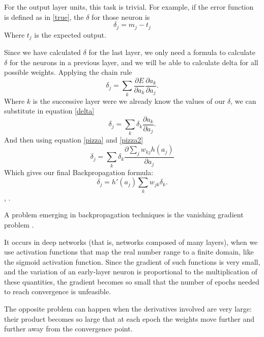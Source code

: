 \documentclass[a4paper]{report}
\begin{document}
For the output layer units, this task is trivial.
For example, if the error function is defined as in \ref{true}, the $\delta$ for those neuron is
\begin{equation}
\delta_j = m_j - t_j
\end{equation}
Where $t_j$ is the expected output.

Since we have calculated $\delta$ for the last layer, we only need a formula to calculate $\delta$ for the neurons in a previous layer, and we will be able to calculate delta for all possible weights.
Applying the chain rule
\begin{equation}
\delta_j = \sum_k \frac{\partial E}{\partial a_k} \frac{\partial a_k}{\partial a_j}.
\end{equation}
Where $k$ is the successive layer were we already know the values of our $\delta$, we can substitute in equation \ref{delta}
\begin{equation}
\delta_j = \sum_k\delta_k \frac{\partial a_k}{\partial a_j}.
\end{equation}
And then using equation \ref{pizza} and \ref{pizza2}
\begin{equation}
\delta_j = \sum_k \delta_k \frac{\partial \sum_j w_{kj} h(a_j)}{\partial a_j}
\end{equation}
Which gives our final Backpropagation formula:
\begin{equation}
\delta_j = h'(a_j)\sum_k w_{jk}\delta_k.
\end{equation}
\cite{bishop2006pattern}, \cite{hastie2001data}.

A problem emerging in backpropagation techniques is the vanishing gradient problem \cite{hochreiter1998vanishing}.

It occurs in deep networks (that is, networks composed of many layers), when we use activation functions that map the real number range to a finite domain, like the sigmoid activation function.
Since the gradient of such functions is very small, and the variation of an early-layer neuron is proportional to the multiplication of these quantities, the gradient becomes so small that the number of epochs needed to reach convergence is unfeasible.

The opposite problem can happen when the derivatives involved are very large: their product becomes so large that at each epoch the weights move further and further away from the convergence point.
\end{document}
